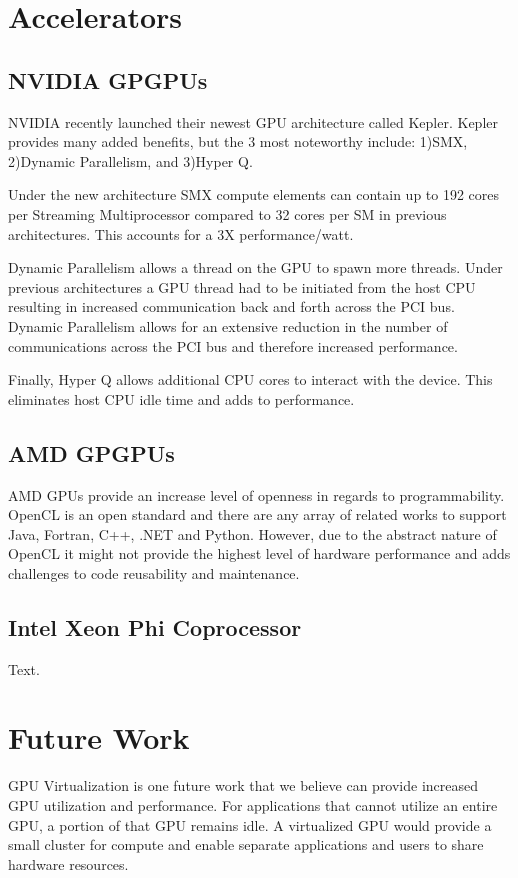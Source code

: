 \documentclass[conference]{IEEEtran}
\begin{document}
\section{Accelerators}

\subsection{NVIDIA GPGPUs}
NVIDIA recently launched their newest GPU architecture called Kepler. \cite{NVIDIA_Kepler} Kepler provides many added benefits, but the 3 most noteworthy include: 1)SMX,  2)Dynamic Parallelism, and 3)Hyper Q.

Under the new architecture SMX compute elements can contain up to 192 cores per Streaming Multiprocessor compared to 32 cores per SM in previous architectures. This accounts for a 3X performance/watt.

Dynamic Parallelism allows a thread on the GPU to spawn more threads. Under previous architectures a GPU thread had to be initiated from the host CPU resulting in increased communication back and forth across the PCI bus. Dynamic Parallelism allows for an extensive reduction in the number of communications across the PCI bus and therefore increased performance.

Finally, Hyper Q allows additional CPU cores to interact with the device. This eliminates host CPU idle time and adds to performance.

\subsection{AMD GPGPUs}
AMD GPUs provide an increase level of openness in regards to programmability. \cite{AMD_web} OpenCL is an open standard and there are any array of related works to support Java, Fortran, C++, .NET and Python. However, due to the abstract nature of OpenCL it might not provide the highest level of hardware performance and adds challenges to code reusability and maintenance.

\subsection{Intel Xeon Phi Coprocessor}
Text.\cite{Xeon_Phi_web}

\section{Future Work}
GPU Virtualization is one future work that we believe can provide increased GPU utilization and performance. For applications that cannot utilize an entire GPU, a portion of that GPU remains idle. A virtualized GPU would provide a small cluster for compute and enable separate applications and users to share hardware resources.
\end{document}
